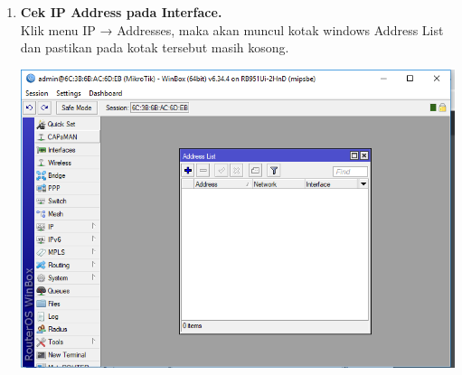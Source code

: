 \documentclass[a4paper,12pt]{article}
\begin{document}
\begin{enumerate}
	\item \textbf{Cek IP Address pada Interface.\\}
	Klik menu IP → Addresses, maka akan muncul kotak windows Address List dan
	pastikan pada kotak tersebut masih kosong.
	\begin{center}
		\includegraphics[scale=.5]{Capture2}
	\end{center}
	

\end{enumerate}
\end{document}
